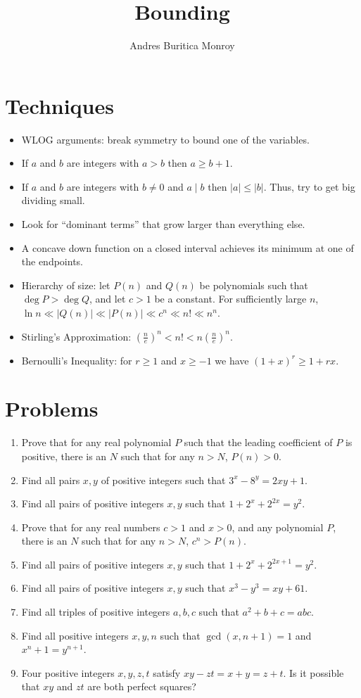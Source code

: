\documentclass{article}
\title{Bounding}
\author{Andres Buritica Monroy}
\date{}
\begin{document}
\maketitle
\section{Techniques}
\begin{itemize}
  \item WLOG arguments: break symmetry to bound one of the variables.
  \item If $a$ and $b$ are integers with $a>b$ then $a\ge b+1$.
  \item If $a$ and $b$ are integers with $b\ne 0$ and $a\mid b$ then
    $|a|\le|b|$. Thus, try to get big dividing small.
  \item Look for ``dominant terms'' that grow larger than everything else.
  \item A concave down function on a closed interval
    achieves its minimum at one of the endpoints.
  \item Hierarchy of size: let $P(n)$ and $Q(n)$ be polynomials such that $\deg
    P>\deg Q$, and let $c>1$ be a constant. For sufficiently large $n$,
    $\ln n\ll|Q(n)|\ll|P(n)|\ll c^n\ll n!\ll n^n$.
  \item Stirling's Approximation: $\left(\frac ne\right)^n<n!<n\left(\frac
    ne\right)^n$.
  \item Bernoulli's Inequality: for $r\ge 1$ and $x\ge -1$ we have $(1+x)^r\ge
    1+rx$.
\end{itemize}
\section{Problems}
\begin{enumerate}
  \item Prove that for any real polynomial $P$ such that the leading coefficient
    of $P$ is positive, there is an $N$ such that for any $n>N$, $P(n)>0$.
  \item Find all pairs $x,y$ of positive integers such that $3^x-8^y=2xy+1$.
  \item Find all pairs of positive integers $x,y$ such that
    $1+2^x+2^{2x}=y^2$.
  \item Prove that for any real numbers $c>1$ and $x>0$, and any polynomial $P$,
    there is an $N$ such that for any $n>N$, $c^n>P(n)$.
  \item Find all pairs of positive integers $x,y$ such that
    $1+2^x+2^{2x+1}=y^2$.
  \item Find all pairs of positive integers $x,y$ such that $x^3-y^3=xy+61$.
  \item Find all triples of positive integers $a,b,c$ such that $a^2+b+c=abc$.
  \item Find all positive integers $x,y,n$ such that $\gcd(x,n+1)=1$ and
    $x^n+1=y^{n+1}$.
  \item Four positive integers $x,y,z,t$ satisfy $xy-zt=x+y=z+t$. Is it possible
    that $xy$ and $zt$ are both perfect squares?
\end{enumerate}
\newpage
\end{document}
